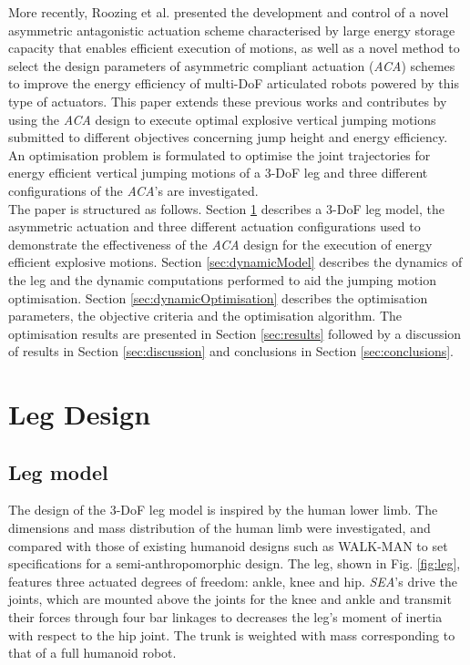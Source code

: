 \documentclass[letterpaper, 10 pt, conference]{ieeeconf}  %
\begin{document}
More recently, Roozing et al. \cite{roozing2016design,roozing2016development} presented the development and control of a novel asymmetric antagonistic actuation scheme characterised by large energy storage capacity that enables efficient execution of motions, as well as a novel method to select the design parameters of asymmetric
compliant actuation (\textit{ACA}) schemes to improve the energy efficiency of multi-DoF articulated robots powered by this type of actuators. This paper extends these previous works and contributes by using the \textit{ACA} design to execute optimal explosive vertical jumping motions submitted to different objectives concerning jump height and energy efficiency. An optimisation problem is formulated to optimise the joint trajectories for energy efficient vertical jumping motions of a 3-DoF leg and three different configurations of the \textit{ACA}'s are investigated.\\
The paper is structured as follows. Section \ref{sec:legDesign} describes a 3-DoF leg model, the asymmetric actuation and three different actuation configurations used to demonstrate the effectiveness of the \textit{ACA} design for the execution of energy efficient explosive motions. Section \ref{sec:dynamicModel} describes the dynamics of the leg and the dynamic computations performed to aid the jumping motion optimisation. Section \ref{sec:dynamicOptimisation} describes the optimisation parameters, the objective criteria and the optimisation algorithm. The optimisation results are presented in Section \ref{sec:results} followed by a discussion of results in Section \ref{sec:discussion} and conclusions in Section \ref{sec:conclusions}.


\section{Leg Design } \label{sec:legDesign}

\subsection{Leg model}

The design of the 3-DoF leg model is inspired by the human lower limb. The dimensions and mass distribution of the human limb were investigated, and compared with those of existing humanoid designs such as WALK-MAN \cite{tsagarakis2017walk} to set specifications for a semi-anthropomorphic design. The leg, shown in Fig. \ref{fig:leg}, features three actuated degrees of freedom: ankle, knee and hip. \textit{SEA}'s drive the joints, which are mounted above the joints for the knee and ankle and transmit their forces through four bar linkages to decreases the leg’s moment of inertia with respect to the hip joint. The trunk is weighted with mass corresponding to that of a full humanoid robot.
\end{document}
